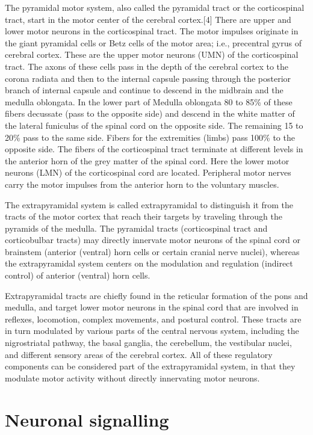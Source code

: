 The pyramidal motor system, also called the pyramidal tract or the corticospinal tract, start in the motor center of the cerebral cortex.{[}4{]} There are upper and lower motor neurons in the corticospinal tract. The motor impulses originate in the giant pyramidal cells or Betz cells of the motor area; i.e., precentral gyrus of cerebral cortex. These are the upper motor neurons (UMN) of the corticospinal tract. The axons of these cells pass in the depth of the cerebral cortex to the corona radiata and then to the internal capsule passing through the posterior branch of internal capsule and continue to descend in the midbrain and the medulla oblongata. In the lower part of Medulla oblongata 80 to 85\% of these fibers decussate (pass to the opposite side) and descend in the white matter of the lateral funiculus of the spinal cord on the opposite side. The remaining 15 to 20\% pass to the same side. Fibers for the extremities (limbs) pass 100\% to the opposite side. The fibers of the corticospinal tract terminate at different levels in the anterior horn of the grey matter of the spinal cord. Here the lower motor neurons (LMN) of the corticospinal cord are located. Peripheral motor nerves carry the motor impulses from the anterior horn to the voluntary muscles.

The extrapyramidal system is called extrapyramidal to distinguish it from the tracts of the motor cortex that reach their targets by traveling through the pyramids of the medulla. The pyramidal tracts (corticospinal tract and corticobulbar tracts) may directly innervate motor neurons of the spinal cord or brainstem (anterior (ventral) horn cells or certain cranial nerve nuclei), whereas the extrapyramidal system centers on the modulation and regulation (indirect control) of anterior (ventral) horn cells.

Extrapyramidal tracts are chiefly found in the reticular formation of the pons and medulla, and target lower motor neurons in the spinal cord that are involved in reflexes, locomotion, complex movements, and postural control. These tracts are in turn modulated by various parts of the central nervous system, including the nigrostriatal pathway, the basal ganglia, the cerebellum, the vestibular nuclei, and different sensory areas of the cerebral cortex. All of these regulatory components can be considered part of the extrapyramidal system, in that they modulate motor activity without directly innervating motor neurons.

\hypertarget{neuronal-signalling}{%
\section{Neuronal signalling}\label{neuronal-signalling}}

